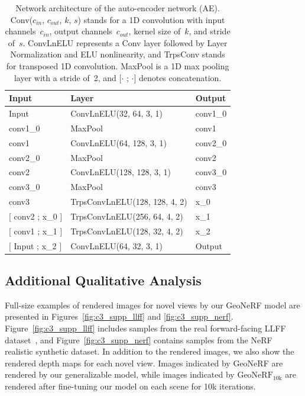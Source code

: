 \begin{table}[t]
    \begin{center}
        \begin{threeparttable}
            \begin{tabular}{lll}
            Input &  Layer & Output  \\
            \hline
            Input & ConvLnELU(32, 64, 3, 1) & conv1\_0  \\
            conv1\_0 & MaxPool & conv1 \\
            conv1 & ConvLnELU(64, 128, 3, 1) & conv2\_0 \\
            conv2\_0 & MaxPool & conv2 \\
            conv2 & ConvLnELU(128, 128, 3, 1) & conv3\_0 \\
            conv3\_0 & MaxPool & conv3 \\
            conv3 & TrpsConvLnELU(128, 128, 4, 2) & x\_0 \\
            $[$ conv2 ; x\_0 $]$ & TrpsConvLnELU(256, 64, 4, 2) & x\_1 \\
            $[$ conv1 ; x\_1 $]$ & TrpsConvLnELU(128, 32, 4, 2) & x\_2 \\
            $[$ Input ; x\_2 $]$ & ConvLnELU(64, 32, 3, 1) & Output \\
            \hline
            \end{tabular}
        \end{threeparttable}
    \end{center}
    \caption{Network architecture of the auto-encoder network (AE). Conv($c_{in}$, $c_{out}$, $k$, $s$) stands for a 1D convolution with input channels~$c_{in}$, output channels~$c_{out}$, kernel size of~$k$, and stride of~$s$. ConvLnELU represents a Conv layer followed by Layer Normalization and ELU nonlinearity, and TrpsConv stands for transposed 1D convolution. MaxPool is a 1D max pooling layer with a stride of~2, and $[\cdot$ ; $\cdot]$ denotes concatenation.}
    \label{table:arch_ae}
\end{table}

\clearpage

\subsection{Additional Qualitative Analysis}
Full-size examples of rendered images for novel views by our GeoNeRF model are presented in Figures~\ref{fig:c3_supp_llff} and \ref{fig:c3_supp_nerf}. Figure~\ref{fig:c3_supp_llff} includes samples from the real forward-facing LLFF dataset~\cite{mildenhall2019llff}, and Figure~\ref{fig:c3_supp_nerf} contains samples from the NeRF realistic synthetic dataset\cite{mildenhall2020nerf}. In addition to the rendered images, we also show the rendered depth maps for each novel view. Images indicated by GeoNeRF are rendered by our generalizable model, while images indicated by $\text{GeoNeRF}_{\text{10k}}$ are rendered after fine-tuning our model on each scene for 10k iterations.


